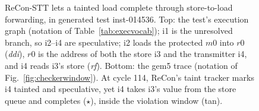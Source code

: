 \begin{figure}[t]
{\begin{tikzpicture}
\end{tikzpicture}%
}%
\caption{
ReCon-STT lets a tainted load complete through store-to-load forwarding, in generated test inst-014536. Top: the test's execution graph (notation of Table~\ref{tab:execvocab}); i1 is the unresolved branch, so i2--i4 are speculative; i2 loads the protected $m0$ into $r0$ (\textit{ddi}), $r0$ is the address of both the store i3 and the transmitter i4, and i4 reads i3's store (\textit{rf}). Bottom: the gem5 trace (notation of Fig.~\ref{fig:checkerwindow}). At cycle 114, ReCon's taint tracker marks i4 tainted and speculative, yet i4 takes i3's value from the store queue and completes ($\star$), inside the violation window (tan).}
\label{fig:reconstl}
\end{figure}
